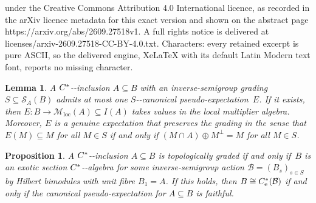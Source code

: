 \documentclass[10pt,a4paper]{amsart}
\providecommand{\nobreakdash}{\nobreak\hbox{-}}
\newtheorem{lemma}[theorem]{Lemma}
\newtheorem{proposition}[theorem]{Proposition}
\newcommand*{\B}{\mathcal B}%
\newcommand*{\Cst}{\textup C^*}%
\newcommand*{\Locmult}{\mathcal{M}_{\mathrm{loc}}}%
\newcommand*{\Slice}{\mathcal S}%
\newcommand*{\ess}{\mathrm{e}}%
\newcommand*{\nb}{\nobreakdash}
\begin{document}
under the Creative Commons Attribution 4.0 International licence, as recorded in the arXiv licence metadata for this exact version and shown on the abstract page https://arxiv.org/abs/2609.27518v1. A full rights notice is delivered at licenses/arxiv-2609.27518-CC-BY-4.0.txt. Characters: every retained excerpt is pure ASCII, so the delivered engine, XeLaTeX with its default Latin Modern text font, reports no missing character.
\begin{lemma}
  \label{lem:genuine_expectation}
  A \(\Cst\)\nb-inclusion \(A\subseteq B\) with an inverse-semigroup
  grading \(S\subseteq \Slice_A(B)\) admits at most one
  \(S\)\nb-canonical pseudo-expectation~\(E\).
  If it exists, then \(E\colon B\to \Locmult(A)\subseteq I(A)\) takes
  values in the local multiplier algebra.
  Moreover, \(E\) is a genuine expectation that preserves the grading
  in the sense that \(E(M)\subseteq M\) for all \(M\in S\) if and only
  if \((M\cap A)\oplus M^\bot=M\) for all \(M\in S\).
\end{lemma}

\begin{proposition}
  \label{prop:topological_grading_characterisation}
  A \(\Cst\)\nb-inclusion \(A\subseteq B\) is topologically graded if
  and only if~\(B\) is an exotic section \(\Cst\)\nb-algebra for some
  inverse-semigroup action \(\B=(B_{s})_{s\in S}\)  by Hilbert
  bimodules with unit fibre \(B_1=A\).
  If this holds, then \(B\cong\Cst_\ess(\B)\) if and only if  the
  canonical pseudo-expectation for \(A\subseteq B\) is faithful.
\end{proposition}
\end{document}
